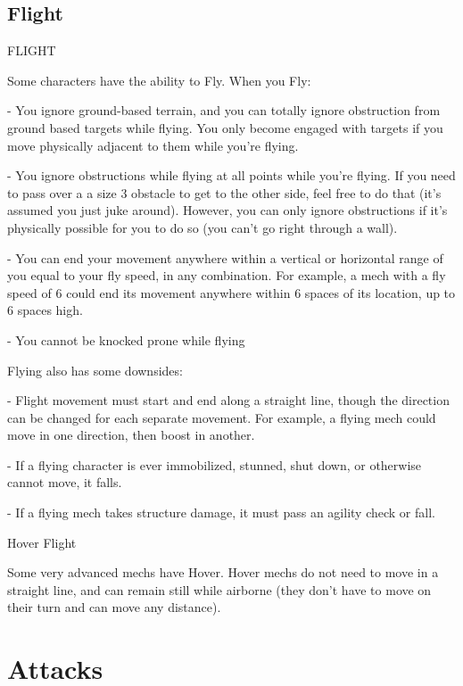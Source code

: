 \section{Flight}
                                                   FLIGHT

Some characters have the ability to Fly. When you Fly:




    -    You ignore ground-based terrain, and you can totally ignore obstruction from ground
         based targets while flying. You only become engaged with targets if you move physically
         adjacent to them while you’re flying.

    -    You ignore obstructions while flying at all points while you’re flying. If you need to pass
         over a a size 3 obstacle to get to the other side, feel free to do that (it’s assumed you just
         juke around). However, you can only ignore obstructions if it’s physically possible for you
         to do so (you can’t go right through a wall).

    -    You can end your movement anywhere within a vertical or horizontal range of you equal
         to your fly speed, in any combination. For example, a mech with a fly speed of 6 could
         end its movement anywhere within 6 spaces of its location, up to 6 spaces high.

    -    You cannot be knocked prone while flying


Flying also has some downsides:

             -    Flight movement must start and end along a straight line, though the direction
                 can be changed for each separate movement. For example, a flying mech could
                  move in one direction, then boost in another.

             -    If a flying character is ever immobilized, stunned, shut down, or otherwise cannot
                  move, it falls.

             -    If a flying mech takes structure damage, it must pass an agility check or fall.


                                                  Hover Flight

Some very advanced mechs have Hover. Hover mechs do not need to move in a straight line,
and can remain still while airborne (they don’t have to move on their turn and can move any
distance).

\chapter{Attacks}


